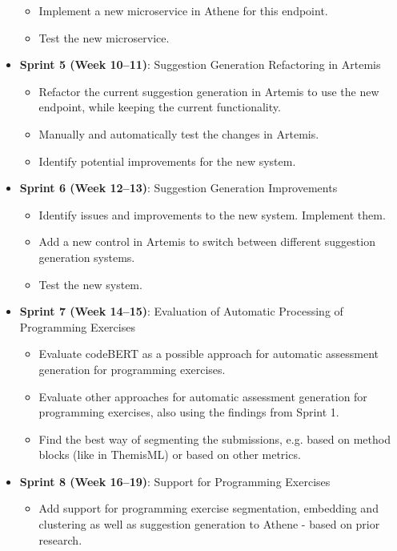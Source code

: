 \begin{itemize}
\begin{itemize}
        \item Implement a new microservice in Athene for this endpoint.
        \item Test the new microservice.
    \end{itemize}
    \item \textbf{Sprint 5 (Week 10--11)}: Suggestion Generation Refactoring in Artemis
    \begin{itemize}
        \item Refactor the current suggestion generation in Artemis to use the new endpoint, while keeping the current functionality.
        \item Manually and automatically test the changes in Artemis.
        \item Identify potential improvements for the new system.
    \end{itemize}
    \item \textbf{Sprint 6 (Week 12--13)}: Suggestion Generation Improvements
    \begin{itemize}
        \item Identify issues and improvements to the new system. Implement them.
        \item Add a new control in Artemis to switch between different suggestion generation systems.
        \item Test the new system.
    \end{itemize}
    \item \textbf{Sprint 7 (Week 14--15)}: Evaluation of Automatic Processing of Programming Exercises
    \begin{itemize}
        \item Evaluate codeBERT as a possible approach for automatic assessment generation for programming exercises.
        \item Evaluate other approaches for automatic assessment generation for programming exercises, also using the findings from Sprint 1.
        \item Find the best way of segmenting the submissions, e.g. based on method blocks (like in ThemisML) or based on other metrics.
    \end{itemize}
    \item \textbf{Sprint 8 (Week 16--19)}: Support for Programming Exercises
    \begin{itemize}
        \item Add support for programming exercise segmentation, embedding and clustering as well as suggestion generation to Athene - based on prior research.

\end{itemize}
\end{itemize}
